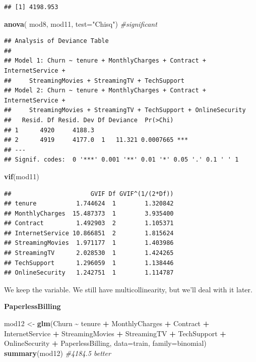 \documentclass[
  twoside]{article}
\newenvironment{Shaded}{\begin{snugshade}}{\end{snugshade}}
\newcommand{\AttributeTok}[1]{\textcolor[rgb]{0.13,0.29,0.53}{#1}}
\newcommand{\CommentTok}[1]{\textcolor[rgb]{0.56,0.35,0.01}{\textit{#1}}}
\newcommand{\FunctionTok}[1]{\textcolor[rgb]{0.13,0.29,0.53}{\textbf{#1}}}
\newcommand{\NormalTok}[1]{#1}
\newcommand{\OtherTok}[1]{\textcolor[rgb]{0.56,0.35,0.01}{#1}}
\newcommand{\SpecialCharTok}[1]{\textcolor[rgb]{0.81,0.36,0.00}{\textbf{#1}}}
\newcommand{\StringTok}[1]{\textcolor[rgb]{0.31,0.60,0.02}{#1}}
\begin{document}
\begin{verbatim}
## [1] 4198.953
\end{verbatim}

\begin{Shaded}
\begin{Highlighting}[]
\FunctionTok{anova}\NormalTok{( mod8, mod11,  }\AttributeTok{test=}\StringTok{"Chisq"}\NormalTok{) }\CommentTok{\#significant}
\end{Highlighting}
\end{Shaded}

\begin{verbatim}
## Analysis of Deviance Table
## 
## Model 1: Churn ~ tenure + MonthlyCharges + Contract + InternetService + 
##     StreamingMovies + StreamingTV + TechSupport
## Model 2: Churn ~ tenure + MonthlyCharges + Contract + InternetService + 
##     StreamingMovies + StreamingTV + TechSupport + OnlineSecurity
##   Resid. Df Resid. Dev Df Deviance  Pr(>Chi)    
## 1      4920     4188.3                          
## 2      4919     4177.0  1   11.321 0.0007665 ***
## ---
## Signif. codes:  0 '***' 0.001 '**' 0.01 '*' 0.05 '.' 0.1 ' ' 1
\end{verbatim}

\begin{Shaded}
\begin{Highlighting}[]
\FunctionTok{vif}\NormalTok{(mod11)}
\end{Highlighting}
\end{Shaded}

\begin{verbatim}
##                      GVIF Df GVIF^(1/(2*Df))
## tenure           1.744624  1        1.320842
## MonthlyCharges  15.487373  1        3.935400
## Contract         1.492903  2        1.105371
## InternetService 10.866851  2        1.815624
## StreamingMovies  1.971177  1        1.403986
## StreamingTV      2.028530  1        1.424265
## TechSupport      1.296059  1        1.138446
## OnlineSecurity   1.242751  1        1.114787
\end{verbatim}

We keep the variable. We still have multicollinearity, but we'll deal
with it later.

\textbf{PaperlessBilling}

\begin{Shaded}
\begin{Highlighting}[]
\NormalTok{mod12 }\OtherTok{\textless{}{-}} \FunctionTok{glm}\NormalTok{(Churn }\SpecialCharTok{\textasciitilde{}}\NormalTok{ tenure }\SpecialCharTok{+}\NormalTok{ MonthlyCharges }\SpecialCharTok{+}\NormalTok{ Contract }\SpecialCharTok{+}\NormalTok{ InternetService }\SpecialCharTok{+} 
\NormalTok{               StreamingMovies }\SpecialCharTok{+}\NormalTok{ StreamingTV }\SpecialCharTok{+}\NormalTok{ TechSupport }\SpecialCharTok{+}\NormalTok{ OnlineSecurity }\SpecialCharTok{+}
\NormalTok{               PaperlessBilling, }\AttributeTok{data=}\NormalTok{train, }\AttributeTok{family=}\NormalTok{binomial)}
\FunctionTok{summary}\NormalTok{(mod12) }\CommentTok{\#4184.5 better}
\end{Highlighting}
\end{Shaded}
\end{document}
